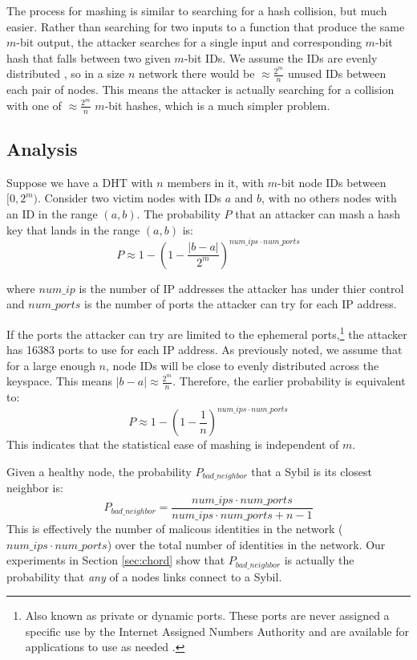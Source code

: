 \documentclass[11pt,conference]{IEEEtran}
\begin{document}
The process for mashing is similar to searching for a hash collision, but much easier.
Rather than searching for two inputs to a function that produce the same $m$-bit output, the attacker searches for a single input and corresponding $m$-bit hash that falls between two given $m$-bit IDs.
We assume the IDs are evenly distributed \cite{bellare2004hash}, so in a size $n$ network there would be $\approx \frac{2^{m}}{n}$ unused IDs between each pair of nodes.
This means the attacker is actually searching for a collision with one of $\approx \frac{2^{m}}{n}$ $m$-bit hashes, which is a much simpler problem.

\subsection{Analysis}


Suppose we have a DHT with $n$ members in it, with $m$-bit node IDs between $[0,2^{m})$. 
Consider two victim nodes with IDs $a$ and $b$, with no others nodes with an ID in the range $(a,b)$.
The probability $P$ that an attacker can mash a hash key that lands in the range $(a,b)$ is:
$$ P \approx 1 - (1 - \frac{|b-a|}{2^{m}})^{num\_ips \cdot num\_ports  } $$

where $num\_ip$ is the number of IP addresses the attacker has under thier control and $num\_ports$ is the number of ports the attacker can try for each IP address.


If the ports the attacker can try are limited to the ephemeral ports,\footnote{Also known as private or dynamic ports.  These ports are never assigned a specific use by the Internet Assigned Numbers Authority  and are available for applications to use as needed \cite{cotton2011internet}.} the attacker has 16383 ports to use for each IP address.
As previously noted, we assume that for a large enough $n$, node IDs will be close to evenly distributed across the keyspace.
This means $|b-a| \approx \frac{2^{m}}{n}$.
Therefore, the earlier probability is equivalent to:
$$ P \approx  1 - (1 -\frac{1}{n})^{num\_ips \cdot num\_ports}  $$
This indicates that the statistical ease of mashing is independent of $m$.

Given a healthy node, the probability $P_{bad\_neighbor}$ that a Sybil is its closest neighbor is:
\begin{equation}
P_{bad\_neighbor} =  \frac{num\_ips \cdot num\_ports}{num\_ips \cdot num\_ports + n - 1}
\label{eq:bad}
\end{equation}
This is effectively the number of malicous identities in the network ($num\_ips \cdot num\_ports$) over the total number of identities in the network.
Our experiments in Section \ref{sec:chord} show that $P_{bad\_neighbor}$ is actually the probability that \textit{any} of a nodes links connect to a Sybil.
\end{document}
